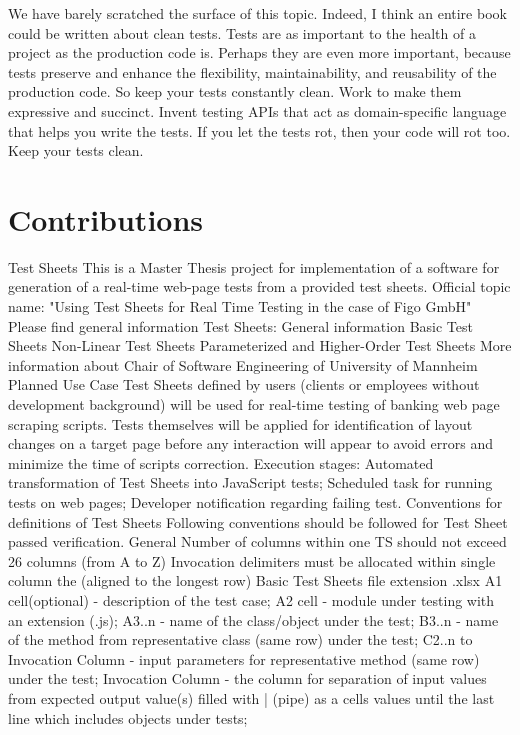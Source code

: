 \documentclass{llncs}
\begin{document}
We have barely scratched the surface of this topic. 
Indeed, I think an entire book could be written about clean tests. 
Tests are as important to the health of a project as the production code is. 
Perhaps they are even more important, because tests preserve and enhance the ﬂexibility, maintainability, and reusability of the production code. 
So keep your tests constantly clean. 
Work to make them expressive and succinct. 
Invent testing APIs that act as domain-speciﬁc language that helps you write the tests. 
If you let the tests rot, then your code will rot too. Keep your tests clean.




\section{Contributions}
\label{sec:contributions}
Test Sheets
This is a Master Thesis project for implementation of a software for generation of a real-time web-page tests from a provided test sheets. Official topic name: "Using Test Sheets for Real Time Testing in the case of Figo GmbH"
Please find general information Test Sheets:
General information
Basic Test Sheets
Non-Linear Test Sheets
Parameterized and Higher-Order Test Sheets
More information about Chair of Software Engineering of University of Mannheim
 Planned Use Case
Test Sheets defined by users (clients or employees without development background) will be used for real-time testing of banking web page scraping scripts. Tests themselves will be applied for identification of layout changes on a target page before any interaction will appear to avoid errors and minimize the time of scripts correction.
Execution stages:
Automated transformation of Test Sheets into JavaScript tests;
Scheduled task for running tests on web pages;
Developer notification regarding failing test.
 Conventions for definitions of Test Sheets
Following conventions should be followed for Test Sheet passed verification.
 General
Number of columns within one TS should not exceed 26 columns (from A to Z)
Invocation delimiters must be allocated within single column the (aligned to the longest row)
 Basic Test Sheets
file extension .xlsx
A1 cell(optional) - description of the test case;
A2 cell - module under testing with an extension (.js);
A3..n - name of the class/object under the test;
B3..n - name of the method from representative class (same row) under the test;
C2..n to Invocation Column - input parameters for representative method (same row) under the test;
Invocation Column - the column for separation of input values from expected output value(s) filled with | (pipe) as a cells values until the last line which includes objects under tests;
\end{document}
